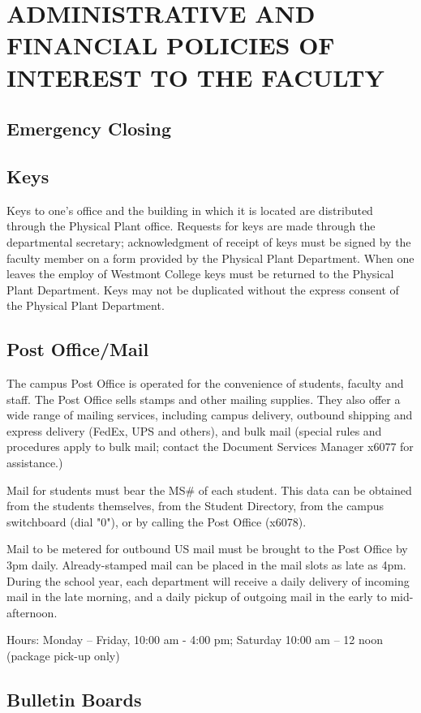 \section{ADMINISTRATIVE AND FINANCIAL POLICIES OF INTEREST TO THE FACULTY}
	\subsection{Emergency Closing}
	\subsection{Keys}
		Keys to one's office and the building in which it is located are distributed through the Physical Plant office.  Requests for keys are made through the departmental secretary; acknowledgment of receipt of keys must be signed by the faculty member on a form provided by the Physical Plant Department.  When one leaves the employ of Westmont College keys must be returned to the Physical Plant Department.  Keys may not be duplicated without the express consent of the Physical Plant Department.
	\subsection{Post Office/Mail}
		The campus Post Office is operated for the convenience of students, faculty and staff. The Post Office sells stamps and other mailing supplies. They also offer a wide range of mailing services, including campus delivery, outbound shipping and express delivery (FedEx, UPS and others), and bulk mail (special rules and procedures apply to bulk mail; contact the Document Services Manager x6077 for assistance.)

		Mail for students must bear the MS\# of each student. This data can be obtained from the students themselves, from the Student Directory, from the campus switchboard (dial "0"), or by calling the Post Office (x6078).

		Mail to be metered for outbound US mail must be brought to the Post Office by 3pm daily. Already-stamped mail can be placed in the mail slots as late as 4pm. During the school year, each department will receive a daily delivery of incoming mail in the late morning, and a daily pickup of outgoing mail in the early to mid-afternoon.

		Hours:  Monday -- Friday, 10:00 am - 4:00 pm; Saturday 10:00 am -- 12 noon (package pick-up only)
	\subsection{Bulletin Boards}
